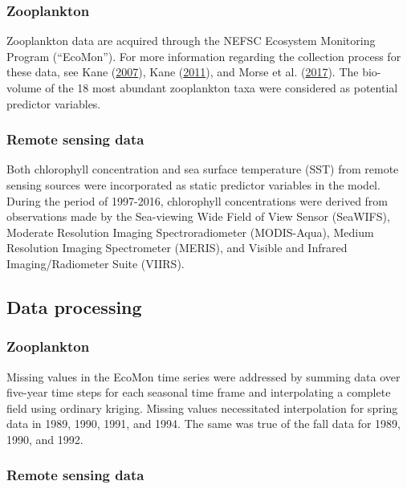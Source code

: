 \documentclass[
]{book}
\begin{document}
\hypertarget{zooplankton}{%
\subsubsection{Zooplankton}\label{zooplankton}}

Zooplankton data are acquired through the NEFSC Ecosystem Monitoring Program (``EcoMon''). For more information regarding the collection process for these data, see Kane (\protect\hyperlink{ref-Kane2007}{2007}), Kane (\protect\hyperlink{ref-Kane2011}{2011}), and Morse et al. (\protect\hyperlink{ref-Morse2017}{2017}). The bio-volume of the 18 most abundant zooplankton taxa were considered as potential predictor variables.

\hypertarget{remote-sensing-data}{%
\subsubsection{Remote sensing data}\label{remote-sensing-data}}

Both chlorophyll concentration and sea surface temperature (SST) from remote sensing sources were incorporated as static predictor variables in the model. During the period of 1997-2016, chlorophyll concentrations were derived from observations made by the Sea-viewing Wide Field of View Sensor (SeaWIFS), Moderate Resolution Imaging Spectroradiometer (MODIS-Aqua), Medium Resolution Imaging Spectrometer (MERIS), and Visible and Infrared Imaging/Radiometer Suite (VIIRS).

\hypertarget{data-processing-18}{%
\subsection{Data processing}\label{data-processing-18}}

\hypertarget{zooplankton-1}{%
\subsubsection{Zooplankton}\label{zooplankton-1}}

Missing values in the EcoMon time series were addressed by summing data over five-year time steps for each seasonal time frame and interpolating a complete field using ordinary kriging. Missing values necessitated interpolation for spring data in 1989, 1990, 1991, and 1994. The same was true of the fall data for 1989, 1990, and 1992.

\hypertarget{remote-sensing-data-1}{%
\subsubsection{Remote sensing data}\label{remote-sensing-data-1}}
\end{document}
